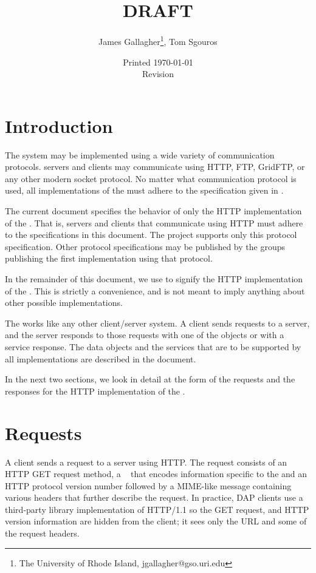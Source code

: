 \documentclass[justify]{dods-paper}
\title{\DAPHTTPTitle\\ DRAFT}
\author{James Gallagher\thanks{The University of Rhode Island,
    jgallagher@gso.uri.edu}, Tom Sgouros}
\date{Printed \today \\ Revision \rcsInfoRevision}
\begin{document}
\maketitle
\T\tableofcontents

\section{Introduction}

The \opendap system may be implemented using a wide variety of
communication protocols.  \DAP servers and clients may communicate
using HTTP, FTP, GridFTP, or any other modern socket protocol.  No
matter what communication protocol is used, all implementations of the
\DAP must adhere to the specification given in \DAPObjects.  

The current document specifies the behavior of only the HTTP
implementation of the \DAP.  That is, \DAP servers and clients that
communicate using HTTP must adhere to the specifications in this
document.  The \opendap project supports only this protocol
specification.  Other protocol specifications may be published by the
groups publishing the first implementation using that protocol.

In the remainder of this document, we use \DAP to signify the HTTP
implementation of the \DAP.  This is strictly a convenience, and is
not meant to imply anything about other possible implementations.

The \DAP works like any other client/server system.  A client sends
requests to a server, and the server responds to those requests with
one of the \DAP objects or with a service response.  The data objects
and the services that are to be supported by all \DAP implementations
are described in the \DAPObjects document.

In the next two sections, we look in detail at the form of
the requests and the responses for the HTTP implementation of the
\DAP. 


\section{Requests}
\label{sec-requests}

A \DAP client sends a request to a server using HTTP.  The request
consists of an HTTP GET request method, a \URI~\cite{rfc2396} that
encodes information specific to the \DAP and an HTTP protocol version
number followed by a MIME-like message containing various headers that
further describe the request. In practice, DAP clients use a
third-party library implementation of HTTP/1.1 so the GET request,
\URI and HTTP version information are hidden from the client; it sees
only the \DAP URL and some of the request headers.  
\end{document}
